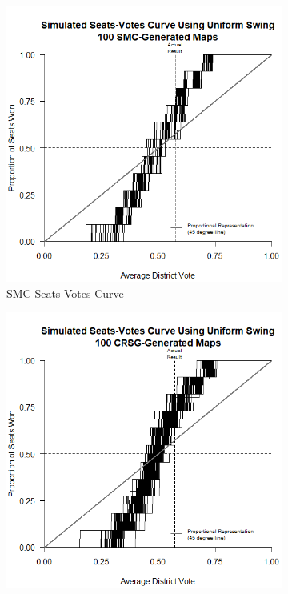 \begin{figure}[h]
    \caption{\hyperref[sec:seatsvotes]{Seats-Votes Curves} for \hyperref[sec:smc]{SMC}- and \hyperref[sec:crsg]{CRSG}-Generated Maps and Existing Map}
    \begin{subfigure}[b]{0.45\textwidth}
        \includegraphics[width=\textwidth]{img/sv.smc.png}
        \caption{SMC Seats-Votes Curve}
        \label{fig:sv.smc}
    \end{subfigure}
    \hfill
    \begin{subfigure}[b]{0.45\textwidth}
        \includegraphics[width=\textwidth]{img/sv.crsg.png}

\end{subfigure}
\end{figure}
